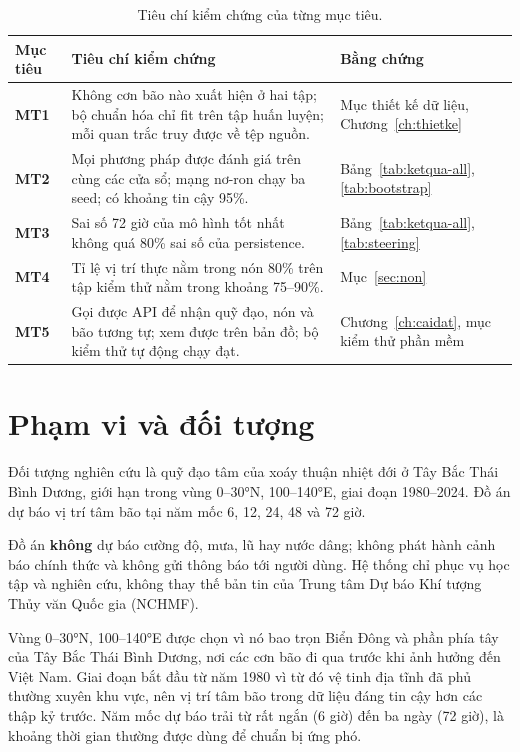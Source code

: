 \begin{table}[H]
\centering
\caption{Tiêu chí kiểm chứng của từng mục tiêu.}
\label{tab:tieuchi}
\begin{tabularx}{\textwidth}{>{\bfseries\color{daunavy}}l X >{\raggedright\arraybackslash}p{3.6cm}}
\toprule
\rowcolor{gray100}\bfseries\color{daunavy}Mục tiêu & \leavevmode\bfseries\color{daunavy}Tiêu chí kiểm chứng & \leavevmode\bfseries\color{daunavy}Bằng chứng \\
\midrule
MT1 & Không cơn bão nào xuất hiện ở hai tập; bộ chuẩn hóa chỉ fit trên tập huấn luyện; mỗi quan trắc truy được về tệp nguồn. & Mục thiết kế dữ liệu, Chương~\ref{ch:thietke} \\
MT2 & Mọi phương pháp được đánh giá trên cùng các cửa sổ; mạng nơ-ron chạy ba seed; có khoảng tin cậy 95\%. & Bảng~\ref{tab:ketqua-all}, \ref{tab:bootstrap} \\
MT3 & Sai số 72 giờ của mô hình tốt nhất không quá 80\% sai số của persistence. & Bảng~\ref{tab:ketqua-all}, \ref{tab:steering} \\
MT4 & Tỉ lệ vị trí thực nằm trong nón 80\% trên tập kiểm thử nằm trong khoảng 75--90\%. & Mục~\ref{sec:non} \\
MT5 & Gọi được API để nhận quỹ đạo, nón và bão tương tự; xem được trên bản đồ; bộ kiểm thử tự động chạy đạt. & Chương~\ref{ch:caidat}, mục kiểm thử phần mềm \\
\bottomrule
\end{tabularx}
\end{table}

\section{Phạm vi và đối tượng}

Đối tượng nghiên cứu là quỹ đạo tâm của xoáy thuận nhiệt đới ở Tây Bắc Thái
Bình Dương, giới hạn trong vùng 0--30°N, 100--140°E, giai đoạn 1980--2024.
Đồ án dự báo vị trí tâm bão tại năm mốc 6, 12, 24, 48 và 72 giờ.

Đồ án \textbf{không} dự báo cường độ, mưa, lũ hay nước dâng; không phát hành
cảnh báo chính thức và không gửi thông báo tới người dùng. Hệ thống chỉ phục
vụ học tập và nghiên cứu, không thay thế bản tin của Trung tâm Dự báo Khí
tượng Thủy văn Quốc gia (NCHMF).

Vùng 0--30°N, 100--140°E được chọn vì nó bao trọn Biển Đông và phần phía tây
của Tây Bắc Thái Bình Dương, nơi các cơn bão đi qua trước khi ảnh hưởng đến
Việt Nam. Giai đoạn bắt đầu từ năm 1980 vì từ đó vệ tinh địa tĩnh đã phủ
thường xuyên khu vực, nên vị trí tâm bão trong dữ liệu đáng tin cậy hơn các
thập kỷ trước. Năm mốc dự báo trải từ rất ngắn (6 giờ) đến ba ngày (72 giờ),
là khoảng thời gian thường được dùng để chuẩn bị ứng phó.

